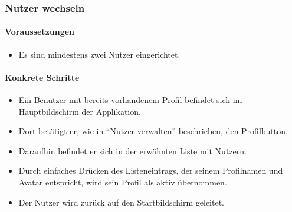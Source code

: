 \subsubsection{Nutzer wechseln}
\paragraph{Voraussetzungen}
\begin{itemize}
\item Es sind mindestens zwei Nutzer eingerichtet.
\end{itemize}

\paragraph{Konkrete Schritte}
\begin{itemize}
\item Ein Benutzer mit bereits vorhandenem Profil befindet sich im Hauptbildschirm der Applikation.
\item Dort betätigt er, wie in "`Nutzer verwalten"' beschrieben, den Profilbutton.
\item Daraufhin befindet er sich in der erwähnten Liste mit Nutzern. 
\item Durch einfaches Drücken des Listeneintrags, der seinem Profilnamen und
Avatar entspricht, wird sein Profil als aktiv übernommen.
\item Der Nutzer wird zurück auf den Startbildschirm geleitet.
\end{itemize}
